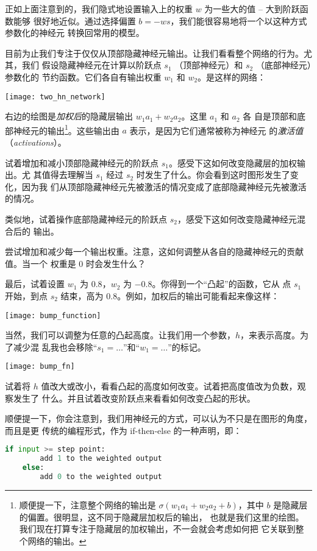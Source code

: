 正如上面注意到的，我们隐式地设置输入上的权重 $w$ 为一些大的值 -- 大到阶跃函数能够
很好地近似。通过选择偏置 $b = -ws$，我们能很容易地将一个以这种方式参数化的神经元
转换回常用的模型。

目前为止我们专注于仅仅从顶部隐藏神经元输出。让我们看看整个网络的行为。尤其，我们
假设隐藏神经元在计算以阶跃点 $s_1$ （顶部神经元）和 $s_2$ （底部神经元）参数化的
节约函数。它们各自有输出权重 $w_1$ 和 $w_2$。是这样的网络：
\begin{center}
  \texttt{[image: two\_hn\_network]}
\end{center}

右边的绘图是\emph{加权后}的隐藏层输出 $w_1 a_1 + w_2 a_2$。这里 $a_1$ 和 $a_2$ 各
自是顶部和底部神经元的输出\footnote{顺便提一下，注意整个网络的输出是 $\sigma(w_1
  a_1+w_2 a_2 + b)$，其中 $b$ 是隐藏层的偏置。很明显，这不同于隐藏层加权后的输出，
  也就是我们这里的绘图。我们现在打算专注于隐藏层的加权输出，不一会就会考虑如何把
  它关联到整个网络的输出。}。这些输出由 $a$ 表示，是因为它们通常被称为神经元
的\emph{激活值}（\textit{activations}）。

试着增加和减小顶部隐藏神经元的阶跃点 $s_1$。感受下这如何改变隐藏层的加权输出。尤
其值得去理解当 $s_1$ 经过 $s_2$ 时发生了什么。你会看到这时图形发生了变化，因为我
们从顶部隐藏神经元先被激活的情况变成了底部隐藏神经元先被激活的情况。

类似地，试着操作底部隐藏神经元的阶跃点 $s_2$，感受下这如何改变隐藏神经元混合后的
输出。

尝试增加和减少每一个输出权重。注意，这如何调整从各自的隐藏神经元的贡献值。当一个
权重是 0 时会发生什么？

最后，试着设置 $w_1$ 为 $0.8$，$w_2$ 为 $-0.8$。你得到一个“凸起”的函数，它从
点 $s_1$ 开始，到点 $s_2$ 结束，高为 $0.8$。例如，加权后的输出可能看起来像这样：
\begin{center}
  \texttt{[image: bump\_function]}
\end{center}

当然，我们可以调整为任意的凸起高度。让我们用一个参数，$h$，来表示高度。为了减少混
乱我也会移除“$s_1 = \ldots$”和“$w_1 = \ldots$”的标记。
\begin{center}
  \texttt{[image: bump\_fn]}
\end{center}

试着将 $h$ 值改大或改小，看看凸起的高度如何改变。试着把高度值改为负数，观察发生了
什么。并且试着改变阶跃点来看看如何改变凸起的形状。

顺便提一下，你会注意到，我们用神经元的方式，可以认为不只是在图形的角度，而且是更
传统的编程形式，作为 {\serif if-then-else} 的一种声明，即：
\begin{lstlisting}[language=Python]
    if input >= step point:
        add 1 to the weighted output
    else:
        add 0 to the weighted output  
\end{lstlisting}

